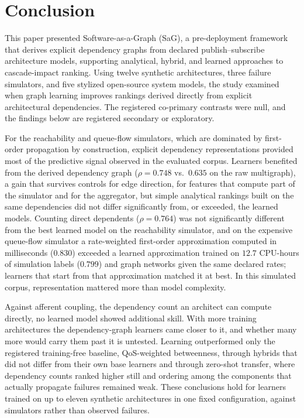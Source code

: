 \section{Conclusion}
\label{sec:9}

This paper presented Software-as-a-Graph (SaG), a pre-deployment framework that derives explicit dependency graphs from declared publish--subscribe architecture models, supporting analytical, hybrid, and learned approaches to cascade-impact ranking. Using twelve synthetic architectures, three failure simulators, and five stylized open-source system models, the study examined when graph learning improves rankings derived directly from explicit architectural dependencies. The registered co-primary contrasts were null, and the findings below are registered secondary or exploratory.

For the reachability and queue-flow simulators, which are dominated by first-order propagation by construction, explicit dependency representations provided most of the predictive signal observed in the evaluated corpus. Learners benefited from the derived dependency graph ($\rho = 0.748$ vs.\ $0.635$ on the raw multigraph), a gain that survives controls for edge direction, for features that compute part of the simulator and for the aggregator, but simple analytical rankings built on the same dependencies did not differ significantly from, or exceeded, the learned models. Counting direct dependents ($\rho = 0.764$) was not significantly different from the best learned model on the reachability simulator, and on the expensive queue-flow simulator a rate-weighted first-order approximation computed in milliseconds ($0.830$) exceeded a learned approximation trained on $12.7$ CPU-hours of simulation labels ($0.799$) and graph networks given the same declared rates; learners that start from that approximation matched it at best. In this simulated corpus, representation mattered more than model complexity.

Against afferent coupling, the dependency count an architect can compute directly, no learned model showed additional skill. With more training architectures the dependency-graph learners came closer to it, and whether many more would carry them past it is untested. Learning outperformed only the registered training-free baseline, QoS-weighted betweenness, through hybrids that did not differ from their own base learners and through zero-shot transfer, where dependency counts ranked higher still and ordering among the components that actually propagate failures remained weak. These conclusions hold for learners trained on up to eleven synthetic architectures in one fixed configuration, against simulators rather than observed failures.

